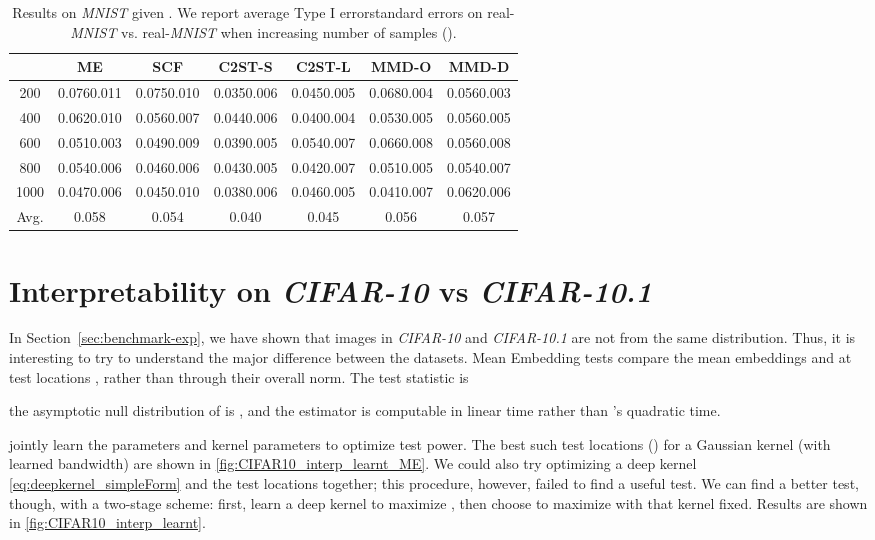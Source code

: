 \documentclass{article}
\newcommand{\mnstd}[2]{#1{\scriptsize#2}}
\begin{document}
\begin{table}[!t]
\centering
  \small
  \caption{Results on \emph{MNIST} given . We report  average Type I errorstandard errors on real-\emph{MNIST} vs. real-\emph{MNIST} when increasing number of samples ().} \label{tab:MNIST_RES2}
\begin{tabular}{c|cccccc}
\toprule
 & ME & SCF & C2ST-S & C2ST-L & MMD-O & MMD-D \\
\midrule
200 &\mnstd{0.076}{0.011} & \mnstd{0.075}{0.010} & \mnstd{0.035}{0.006} & \mnstd{0.045}{0.005} & \mnstd{0.068}{0.004} & \mnstd{0.056}{0.003}  \\
400 & \mnstd{0.062}{0.010} & \mnstd{0.056}{0.007} & \mnstd{0.044}{0.006} & \mnstd{0.040}{0.004} & \mnstd{0.053}{0.005} & \mnstd{0.056}{0.005} \\
600 & \mnstd{0.051}{0.003} & \mnstd{0.049}{0.009} & \mnstd{0.039}{0.005} & \mnstd{0.054}{0.007} & \mnstd{0.066}{0.008} & \mnstd{0.056}{0.008} \\
800 & \mnstd{0.054}{0.006} & \mnstd{0.046}{0.006} & \mnstd{0.043}{0.005} & \mnstd{0.042}{0.007} & \mnstd{0.051}{0.005} & \mnstd{0.054}{0.007} \\
1000 & \mnstd{0.047}{0.006} & \mnstd{0.045}{0.010} & \mnstd{0.038}{0.006} & \mnstd{0.046}{0.005} & \mnstd{0.041}{0.007} & \mnstd{0.062}{0.006} \\
\midrule
Avg. &0.058 & 0.054 & 0.040 & 0.045 & 0.056 & 0.057 \\
\bottomrule
\end{tabular}

\end{table}

\section{Interpretability on \emph{CIFAR-10} vs \emph{CIFAR-10.1}} \label{sec:cifar-interp}

In Section~\ref{sec:benchmark-exp}, we have shown that images in \emph{CIFAR-10} and \emph{CIFAR-10.1} are not from the same distribution. Thus, it is interesting to try to understand the major difference between the datasets. Mean Embedding tests \citep{Chwialkowski2015} compare the mean embeddings  and  at test locations , rather than through their overall norm.
The test statistic is

the asymptotic null distribution of  is ,
and the estimator is computable in linear time rather than 's quadratic time.

 jointly learn the parameters  and kernel parameters to optimize test power.
The best such test locations () for a Gaussian kernel (with learned bandwidth) are shown in \cref{fig:CIFAR10_interp_learnt_ME}.
We could also try optimizing a deep kernel \eqref{eq:deepkernel_simpleForm} and the test locations together;
this procedure, however, failed to find a useful test.
We can find a better test, though, with a two-stage scheme:
first, learn a deep kernel to maximize ,
then choose  to maximize  with that kernel fixed.
Results are shown in \cref{fig:CIFAR10_interp_learnt}.
\end{document}
